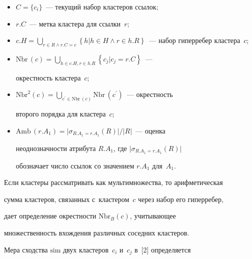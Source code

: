   \begin{itemize}


  \item 


$C = \{c_i\}$~--- текущий набор клас\-те\-ров ссылок;


\item 


$r.C$~--- метка кластера для ссылки~$r$;


\item 


$c.H=\bigcup\nolimits_{r\in R\wedge r.C=c} \left\{ h\vert h\in H\wedge r\in 


h.R\right\}$~---  набор гиперребер клас\-те\-ра~$c$;


\item 


$\mathrm{Nbr}\,(c)=\bigcup_{h\in c.H, r\in h.R} \left\{ c_j\vert c_j=r.C\right\}$~--- 


окрестность кластера~$c$;


\item 


$\mathrm{Nbr}^2(c)=\bigcup_{c^\prime \in \mathrm{Nbr}\,(c)} \mathrm{Nbr}\,(c^\prime)$~--- окрест\-ность 


второго порядка для клас\-те\-ра~$c$;


\item 


$\mathrm{Amb}\,(r.A_1)=\vert \sigma_{R.A_1=r.A_1} (R)\vert/\vert R\vert$~--- оценка 


неоднозначности атрибута $R.A_1$, где $\vert \sigma_{R.A_1=r.A_1} (R)\vert $ 


обозначает чис\-ло ссылок со значением $r.A_1$ для~$A_1$.


\end{itemize}


  


  Если кластеры рассматривать как мультимножества, то арифметическая 


сумма клас\-те\-ров, связанных с~кластером~$c$ через набор его ги\-пер\-ре\-бер, 


дает определение окрест\-ности $\mathrm{Nbr}_{B}(c)$, учи\-ты\-ва\-ющее 


мно\-жест\-вен\-ность вхож\-де\-ния различных со\-сед\-них клас\-те\-ров.


  


  Мера сходства $\mathrm{sim}$ двух кластеров~$c_i$ и~$c_j$ в~[2] определяется 


